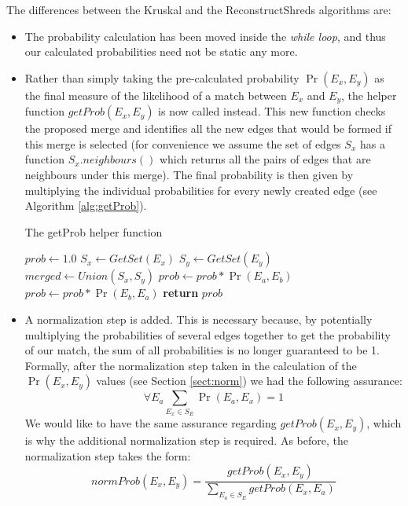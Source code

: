 The differences between the Kruskal and the ReconstructShreds algorithms are:
\begin{itemize}
\item The probability calculation has been moved inside the \emph{while loop}, and thus our calculated probabilities need not be static any more.
\item Rather than simply taking the pre-calculated probability $\Pr(E_x,E_y)$ as the final measure of the likelihood of a match between $E_x$ and $E_y$, the helper function $getProb(E_x,E_y)$ is now called instead. This new function checks the proposed merge and identifies all the new edges that would be formed if this merge is selected (for convenience we assume the set of edges $S_x$ has a function $S_x.neighbours()$ which returns all the pairs of edges that are neighbours under this merge). The final probability is then given by multiplying the individual probabilities for every newly created edge (see Algorithm \ref{alg:getProb}).

\begin{algorithm}[h]
\caption{The getProb helper function}
\begin{algorithmic}[1]
  \State $prob \gets 1.0$
  \State $S_x \gets GetSet(E_x)$ 
  \State $S_y \gets GetSet(E_y)$ 
  \State $merged \gets Union(S_x,S_y)$ 
   
      \State $prob \gets prob * \Pr(E_a,E_b)$
      \State $prob \gets prob * \Pr(E_b,E_a)$
      \EndIf
    \EndFor
  \EndFor
  \State \textbf{return} $prob$
\EndProcedure
\end{algorithmic}
\label{alg:getProb}
\end{algorithm}

\item A normalization step is added. This is necessary because, by potentially multiplying the probabilities of several edges together to get the probability of our match, the sum of all probabilities is no longer guaranteed to be 1. Formally, after the normalization step taken in the calculation of the $\Pr(E_x,E_y)$ values (see Section \ref{sect:norm}) we had the following assurance: \[\forall E_a \sum_{E_x \in S_E} \Pr(E_a,E_x) = 1 \] We would like to have the same assurance regarding $getProb(E_x,E_y)$, which is why the additional normalization step is required. As before, the normalization step takes the form: \[ normProb(E_x,E_y) = \frac{getProb(E_x,E_y)}{\sum_{E_a \in S_E} getProb(E_x,E_a)} \]
\end{itemize}


